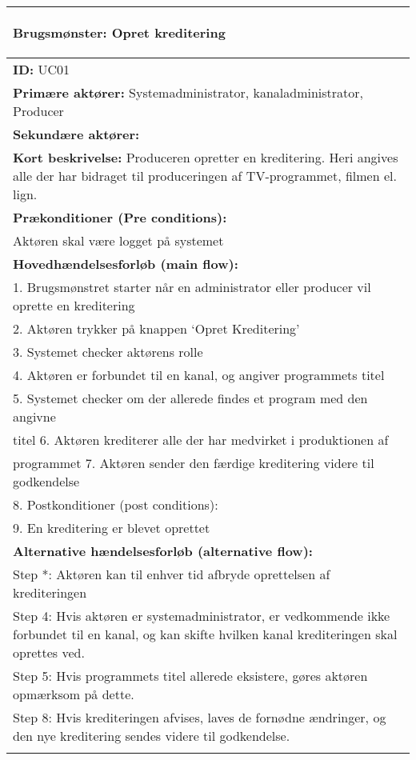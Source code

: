 \begin{table}[H]
\begin{tabular}{|p{14cm}|}
\hline
    \begin{center}{}
    \textbf{Brugsmønster:} Opret kreditering  
    \end{center} \\ \hline
    
	\textbf{ID:} UC01 \\ \hline
	\textbf{Primære aktører:} Systemadministrator, kanaladministrator, Producer \\ \hline
	\textbf{Sekundære aktører:} \\ \hline
	\textbf{Kort beskrivelse:} Produceren opretter en kreditering. Heri angives alle der har bidraget til produceringen af TV-programmet, filmen el. lign. \\ \hline
	\textbf{Prækonditioner (Pre conditions):} \\
Aktøren skal være logget på systemet \\ \hline
\textbf{Hovedhændelsesforløb (main flow):} \\
	1. Brugsmønstret starter når en administrator eller producer vil oprette en kreditering \\
	2. Aktøren trykker på knappen ‘Opret Kreditering’ \\
	3. Systemet checker aktørens rolle \\
	4. Aktøren er forbundet til en kanal, og angiver programmets titel \\
	5. Systemet checker om der allerede findes et program med den angivne \\ titel
	6. Aktøren krediterer alle der har medvirket i produktionen af \\ programmet
	7. Aktøren sender den færdige kreditering videre til godkendelse \\
	8. Postkonditioner (post conditions): \\
	9. En kreditering er blevet oprettet \\ \hline
	\textbf{Alternative hændelsesforløb (alternative flow):} \\
Step *: Aktøren kan til enhver tid afbryde oprettelsen af krediteringen \\
Step 4: Hvis aktøren er systemadministrator, er vedkommende ikke forbundet til en kanal, og kan skifte hvilken kanal krediteringen skal oprettes ved. \\

Step 5: Hvis programmets titel allerede eksistere, gøres aktøren opmærksom på dette. \\

Step 8: Hvis krediteringen afvises, laves de fornødne ændringer, og den nye kreditering sendes videre til godkendelse. \\
\\ \hline
\end{tabular}{}
\end{table}

